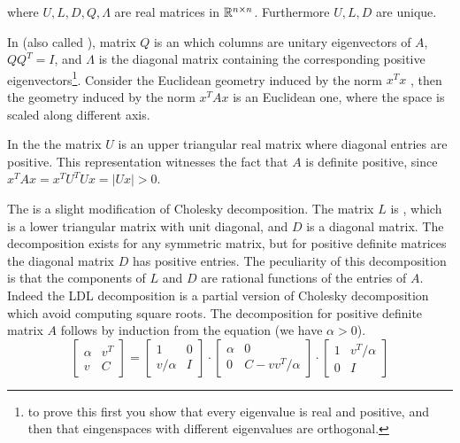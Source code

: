 \documentclass[a4paper,twoside,justified]{tufte-handout}
\begin{document}
where $ U,L,D,Q,\Lambda $ are real matrices in $ \mathbb{R}^{n\times n}
$. Furthermore $ U,L,D $ are unique.

In  (also called
), matrix $ Q $ is an
 which columns are unitary
eigenvectors of $ A $, \ie $ QQ^{T} = I$, and $ \Lambda $ is the
diagonal matrix containing the corresponding positive
eigenvectors\footnote{to prove this first you show that every
  eigenvalue is real and positive, and then that eingenspaces with
  different eigenvalues are orthogonal.}.
%
Consider the Euclidean geometry induced by the norm $ x^{T}x $ , then
the geometry induced by the norm $ x^{T}A x$ is an Euclidean one,
where the space is scaled along different axis.

In the  the matrix $ U $ is an
upper triangular real matrix where diagonal entries are positive. This
representation witnesses the fact that $ A $ is definite positive,
since $ x^{T}A x = x^{T}U^{T}U x = |Ux| > 0 $.

The  is a slight modification of
Cholesky decomposition. The matrix $ L$ is , which is a lower triangular matrix with unit diagonal,
and $ D $ is a diagonal matrix. The decomposition exists for any
symmetric matrix, but for positive definite matrices the diagonal
matrix $D$ has positive entries. The peculiarity of this
decomposition is that the components of $ L $ and $ D $ are rational
functions of the entries of $ A $. Indeed the LDL decomposition is a
partial version of Cholesky decomposition which avoid computing square
roots. The decomposition for positive definite matrix $A$ follows by
induction from the equation (we have $\alpha>0$).
\begin{equation}\label{eq:matr-decomp}
  \begin{bmatrix}
    \alpha & v^{T} \\
    v & C
  \end{bmatrix} =
  \begin{bmatrix}
    1 & 0 \\
    v/\alpha & I
  \end{bmatrix} \cdot
  \begin{bmatrix}
    \alpha & 0 \\
    0 & C -vv^{T}/\alpha
  \end{bmatrix} \cdot
  \begin{bmatrix}
    1 & v^{T}/\alpha \\
    0 & I
  \end{bmatrix} 
\end{equation}
\end{document}
